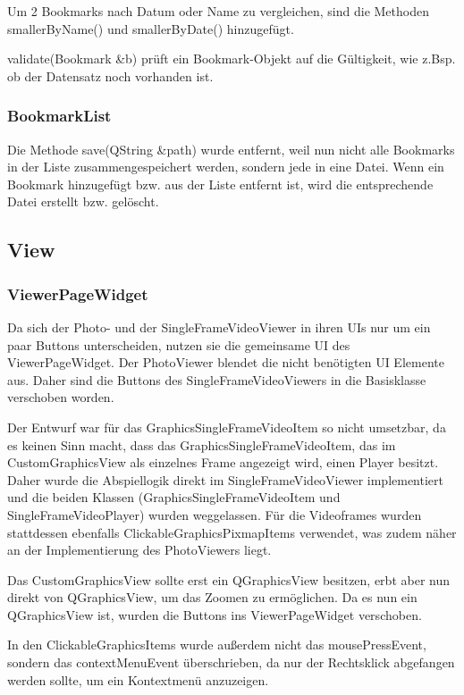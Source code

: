 Um 2 Bookmarks nach Datum oder Name zu vergleichen, sind die Methoden smallerByName() und smallerByDate() hinzugefügt.

validate(Bookmark &b) prüft ein Bookmark-Objekt auf die Gültigkeit, wie z.Bsp. ob der Datensatz noch vorhanden ist.

\subsubsection{BookmarkList}
Die Methode save(QString &path) wurde entfernt, weil nun nicht alle Bookmarks in der Liste zusammengespeichert werden, sondern jede in eine Datei. Wenn ein Bookmark hinzugefügt bzw. aus der Liste entfernt ist, wird die entsprechende Datei erstellt bzw. gelöscht.

\subsection{View}
\subsubsection{ViewerPageWidget}
Da sich der Photo- und der SingleFrameVideoViewer in ihren UIs nur um ein paar Buttons unterscheiden, nutzen sie die gemeinsame UI des ViewerPageWidget. Der PhotoViewer blendet die nicht benötigten UI Elemente aus. Daher sind die Buttons des SingleFrameVideoViewers in die Basisklasse verschoben worden.

Der Entwurf war für das GraphicsSingleFrameVideoItem so nicht umsetzbar, da es keinen Sinn macht, dass das GraphicsSingleFrameVideoItem, das im CustomGraphicsView als einzelnes Frame angezeigt wird, einen Player besitzt. Daher wurde die Abspiellogik direkt im SingleFrameVideoViewer implementiert und die beiden Klassen (GraphicsSingleFrameVideoItem und SingleFrameVideoPlayer) wurden weggelassen. Für die Videoframes wurden stattdessen ebenfalls ClickableGraphicsPixmapItems verwendet, was zudem näher an der Implementierung des PhotoViewers liegt.

Das CustomGraphicsView sollte erst ein QGraphicsView besitzen, erbt aber nun direkt von QGraphicsView, um das Zoomen zu ermöglichen. Da es nun ein QGraphicsView ist, wurden die Buttons ins ViewerPageWidget verschoben.

In den ClickableGraphicsItems wurde außerdem nicht das mousePressEvent, sondern das contextMenuEvent überschrieben, da nur der Rechtsklick abgefangen werden sollte, um ein Kontextmenü anzuzeigen.

